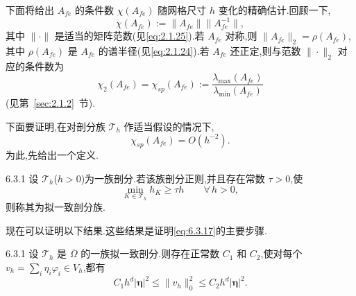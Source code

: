 下面将给出 \(A_{fe}\) 的条件数 \(\chi(A_{fe})\) 随网格尺寸 \(h\) 变化的精确估计.回顾一下,
\[
  \chi(A_{fe}):=\|A_{fe}\|\|A_{fe}^{-1}\|,
\]
其中 \(\|\cdot\|\) 是适当的矩阵范数(见\eqref{eq:2.1.25}).若 \(A_{fe}\) 对称,则 \(\|A_{fe}\|_2=\rho(A_{fe})\),其中 \(\rho(A_{fe})\) 是 \(A_{fe}\) 的谱半径(见\eqref{eq:2.1.24}).若 \(A_{fe}\) 还正定,则与范数 \(\|\cdot\|_2\) 对应的条件数为
\begin{equation}\label{eq:6.3.16}
  \chi_2(A_{fe})=\chi_{sp}(A_{fe}):=\frac{\lambda_{\max}(A_{fe})}{\lambda_{\min}(A_{fe})}
\end{equation}
(见第~\ref{sec:2.1.2}~节).

下面要证明,在对剖分族 \(\mathcal T_h\) 作适当假设的情况下,
\begin{equation}\label{eq:6.3.17}
  \chi_{sp}(A_{fe})=O(h^{-2}).
\end{equation}
为此,先给出一个定义.

\begin{definition}[]{6.3.1}
设 \(\mathcal T_h\)(\(h>0\))为一族剖分.若该族剖分正则,并且存在常数 \(\tau>0\),使
\begin{equation}\label{eq:6.3.18}
  \min_{K\in\mathcal T_h}h_K\ge\tau h\qquad\forall\, h>0,
\end{equation}
则称其为{\heiti 拟一致剖分族}.
\end{definition}

现在可以证明以下结果.这些结果是证明\eqref{eq:6.3.17}的主要步骤.

\begin{proposition}[]{6.3.1}
设 \(\mathcal T_h\) 是 \(\overline\Omega\) 的一族拟一致剖分.则存在正常数 \(C_1\) 和 \(C_2\),使对每个 \(v_h=\sum_i\eta_i\varphi_i\in V_h\),都有
\begin{equation}\label{eq:6.3.19}
  C_1h^d|\boldsymbol{\eta}|^2\le\|v_h\|_0^2\le C_2h^d|\boldsymbol{\eta}|^2.
\end{equation}
\end{proposition}

